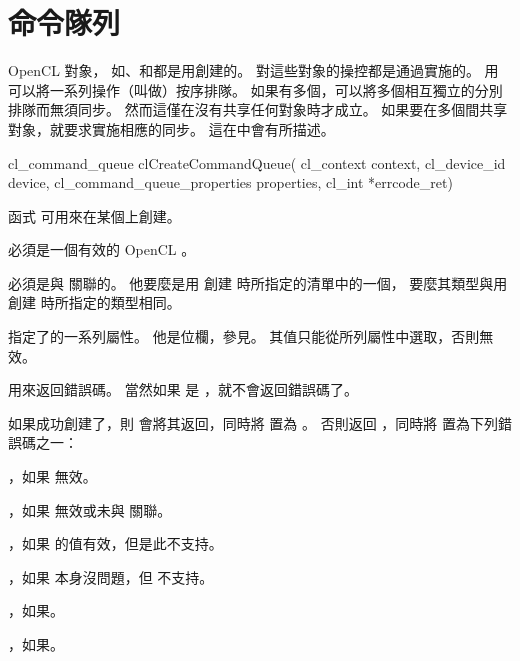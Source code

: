 \section{命令隊列}

OpenCL 對象，
如、和都是用創建的。
對這些對象的操控都是通過實施的。
用可以將一系列操作（叫做）按序排隊。
如果有多個，可以將多個相互獨立的分別排隊而無須同步。
然而這僅在沒有共享任何對象時才成立。
如果要在多個間共享對象，就要求實施相應的同步。
這在中會有所描述。


\startCLFUNC
cl_command_queue clCreateCommandQueue(
			cl_context context,
			cl_device_id device,
			cl_command_queue_properties properties,
			cl_int *errcode_ret)
\stopCLFUNC

函式  可用來在某個上創建。

 必須是一個有效的 OpenCL 。

{}

 必須是與  關聯的。
他要麼是用  創建  時所指定的清單中的一個，
要麼其類型與用  創建  時所指定的類型相同。

 指定了的一系列屬性。
他是位欄，參見。
其值只能從所列屬性中選取，否則無效。

 用來返回錯誤碼。
當然如果  是 ，就不會返回錯誤碼了。

如果成功創建了，則  會將其返回，同時將  置為 。
否則返回 ，同時將  置為下列錯誤碼之一：
\startigBase
\item {}，如果  無效。
\item {}，如果  無效或未與  關聯。
\item {}，如果  的值有效，但是此不支持。
\item {}，如果  本身沒問題，但  不支持。
\item {}，如果\scdevfailres。
\item {}，如果\schostfailres。
\stopigBase

